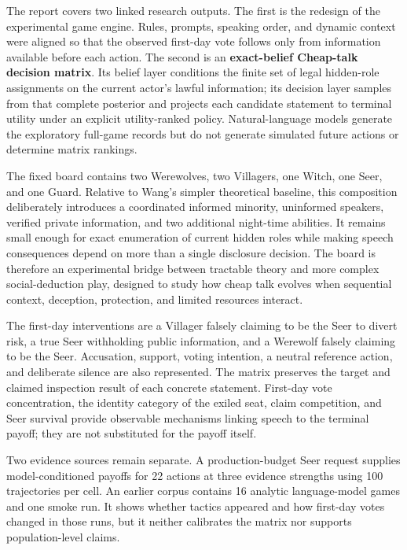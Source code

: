 \documentclass[11pt,a4paper]{article}
\newcommand{\term}[1]{\textbf{#1}}
\begin{document}
The report covers two linked research outputs. The first is the redesign of the experimental game engine. Rules, prompts, speaking order, and dynamic context were aligned so that the observed first-day vote follows only from information available before each action. The second is an \term{exact-belief Cheap-talk decision matrix}. Its belief layer conditions the finite set of legal hidden-role assignments on the current actor's lawful information; its decision layer samples from that complete posterior and projects each candidate statement to terminal utility under an explicit utility-ranked policy. Natural-language models generate the exploratory full-game records but do not generate simulated future actions or determine matrix rankings.

The fixed board contains two Werewolves, two Villagers, one Witch, one Seer, and one Guard. Relative to Wang's simpler theoretical baseline, this composition deliberately introduces a coordinated informed minority, uninformed speakers, verified private information, and two additional night-time abilities. It remains small enough for exact enumeration of current hidden roles while making speech consequences depend on more than a single disclosure decision. The board is therefore an experimental bridge between tractable theory and more complex social-deduction play, designed to study how cheap talk evolves when sequential context, deception, protection, and limited resources interact.

The first-day interventions are a Villager falsely claiming to be the Seer to divert risk, a true Seer withholding public information, and a Werewolf falsely claiming to be the Seer. Accusation, support, voting intention, a neutral reference action, and deliberate silence are also represented. The matrix preserves the target and claimed inspection result of each concrete statement. First-day vote concentration, the identity category of the exiled seat, claim competition, and Seer survival provide observable mechanisms linking speech to the terminal payoff; they are not substituted for the payoff itself.

Two evidence sources remain separate. A production-budget Seer request supplies model-conditioned payoffs for 22 actions at three evidence strengths using 100 trajectories per cell. An earlier corpus contains 16 analytic language-model games and one smoke run. It shows whether tactics appeared and how first-day votes changed in those runs, but it neither calibrates the matrix nor supports population-level claims.
\end{document}
